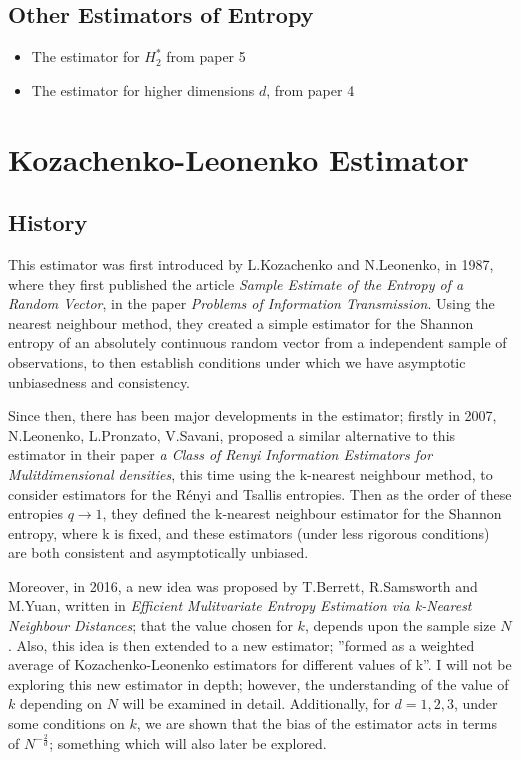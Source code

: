 \documentclass{report}
\begin{document}
\section{Other Estimators of Entropy}
\begin{itemize}
\item The estimator for $H_{2}^{*}$ from paper 5
\item The estimator for higher dimensions $d$, from paper 4
\end{itemize}



\chapter{Kozachenko-Leonenko Estimator}

\section{History}

This estimator was first introduced by L.Kozachenko and N.Leonenko, in 1987, where they first published the article \textit{Sample Estimate of the Entropy of a Random Vector}, in the paper \textit{Problems of Information Transmission}. Using the nearest neighbour method, they created a simple estimator for the Shannon entropy of an absolutely continuous random vector from a independent sample of observations, to then establish conditions under which we have asymptotic unbiasedness and consistency.

Since then, there has been major developments in the estimator; firstly in 2007, N.Leonenko, L.Pronzato, V.Savani, proposed a similar alternative to this estimator in their paper \textit{a Class of Renyi Information Estimators for Mulitdimensional densities}, this time using the k-nearest neighbour method, to consider estimators for the R\'enyi and Tsallis entropies. Then as the order of these entropies $q \to 1$, they defined the k-nearest neighbour estimator for the Shannon entropy, where k is fixed, and these estimators (under less rigorous conditions) are both consistent and asymptotically unbiased.

Moreover, in 2016, a new idea was proposed by T.Berrett, R.Samsworth and M.Yuan, written in \textit{Efficient Mulitvariate Entropy Estimation via k-Nearest Neighbour Distances}; that the value chosen for $k$, depends upon the sample size $N$. Also, this idea is then extended to a new estimator; ''formed as a weighted average of Kozachenko-Leonenko estimators for different values of k''. I will not be exploring this new estimator in depth; however, the understanding of the value of $k$ depending on $N$ will be examined in detail. Additionally, for $d=1, 2,3$, under some conditions on $k$, we are shown that the bias of the estimator acts in terms of $N^{-\frac{2}{d}}$; something which will also later be explored.
\end{document}
